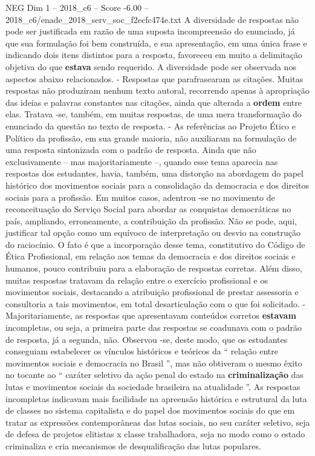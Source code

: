 \begin{textsample}{NEG Dim 1 – 2018\_c6 – Score -6.00 – 2018\_c6/enade\_2018\_serv\_soc\_f2ecfc474e.txt}
A diversidade de respostas não pode ser justificada em razão de uma suposta incompreensão do enunciado, já que sua formulação foi bem construída, e sua apresentação, em uma única frase e indicando dois itens distintos para a resposta, favoreceu em muito a delimitação objetiva do que \textbf{estava} sendo requerido.
A diversidade pode ser observada nos aspectos abaixo relacionados. - Respostas que parafrasearam as citações.
Muitas respostas não produziram nenhum texto autoral, recorrendo apenas à apropriação das ideias e palavras constantes nas citações, ainda que alterada a \textbf{ordem} entre elas.
Tratava -se, também, em muitas respostas, de uma mera transformação do enunciado da questão no texto de resposta. - As referências ao Projeto Ético e Político da profissão, em sua grande maioria, não auxiliaram na formulação de uma resposta sintonizada com o padrão de resposta.
Ainda que não exclusivamente – mas majoritariamente –, quando esse tema aparecia nas respostas dos estudantes, havia, também, uma distorção na abordagem do papel histórico dos movimentos sociais para a consolidação da democracia e dos direitos sociais para a profissão.
Em muitos casos, adentrou -se no movimento de reconceituação do Serviço Social para abordar as conquistas democráticas no país, ampliando, erroneamente, a contribuição da profissão.
Não se pode, aqui, justificar tal opção como um equívoco de interpretação ou desvio na construção do raciocínio.
O fato é que a incorporação desse tema, constitutivo do Código de Ética Profissional, em relação aos temas da democracia e dos direitos sociais e humanos, pouco contribuiu para a elaboração de respostas corretas.
Além disso, muitas respostas tratavam da relação entre o exercício profissional e os movimentos sociais, destacando a atribuição profissional de prestar assessoria e consultoria a tais movimentos, em total desarticulação com o que foi solicitado. - Majoritariamente, as respostas que apresentavam conteúdos corretos \textbf{estavam} incompletas, ou seja, a primeira parte das respostas se coadunava com o padrão de resposta, já a segunda, não.
Observou -se, deste modo, que os estudantes conseguiam estabelecer os vínculos históricos e teóricos da “ relação entre movimentos sociais e democracia no Brasil ”, mas não obtiveram o mesmo êxito no tocante ao “ caráter seletivo da ação penal do estado na \textbf{criminalização} das lutas e movimentos sociais da sociedade brasileira na atualidade ”.
As respostas incompletas indicavam mais facilidade na apreensão histórica e estrutural da luta de classes no sistema capitalista e do papel dos movimentos sociais do que em tratar as expressões contemporâneas das lutas sociais, no seu caráter seletivo, seja de defesa de projetos elitistas x classe trabalhadora, seja no modo como o estado criminaliza e cria mecanismos de desqualificação das lutas populares.

\end{textsample}
